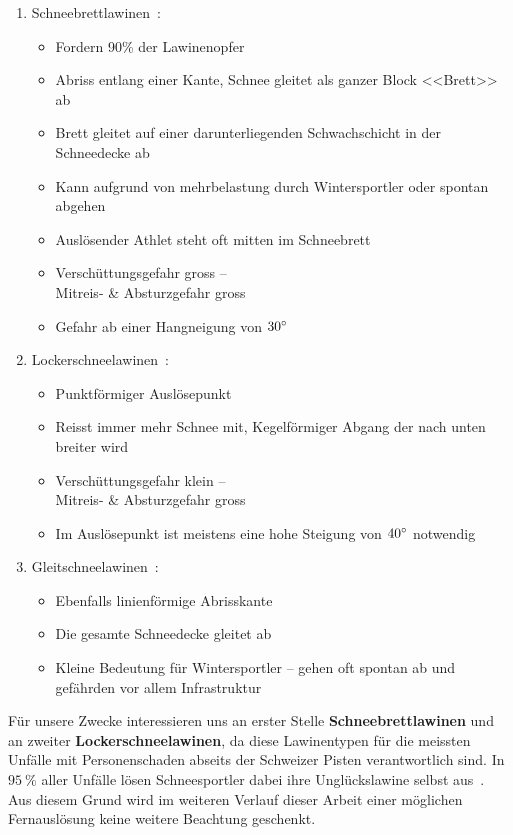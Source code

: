 \begin{multicols}{2}
\begin{enumerate}
  \item Schneebrettlawinen~\cite{sacbergspwinter}\cite{slfLawinentypen}:
  \begin{itemize}
    \item Fordern 90\% der Lawinenopfer
    \item Abriss entlang einer Kante, Schnee gleitet als ganzer Block <<Brett>> ab
    \item Brett gleitet auf einer darunterliegenden Schwachschicht in der Schneedecke ab
    \item Kann aufgrund von mehrbelastung durch Wintersportler oder spontan abgehen
    \item Auslösender Athlet steht oft mitten im Schneebrett
    \item Verschüttungsgefahr gross –\\ Mitreis- \& Absturzgefahr gross
    \item Gefahr ab einer Hangneigung von $30\degree$
  \end{itemize}
    
  \item Lockerschneelawinen~\cite{sacbergspwinter}\cite{slfLawinentypen}:
  \begin{itemize}
    \item Punktförmiger Auslösepunkt
    \item Reisst immer mehr Schnee mit, Kegelförmiger Abgang der nach unten breiter wird
    \item Verschüttungsgefahr klein –\\ Mitreis- \& Absturzgefahr gross
    \item Im Auslösepunkt ist meistens eine hohe Steigung von $40\degree$ notwendig
  \end{itemize}

  \item Gleitschneelawinen~\cite{sacbergspwinter}\cite{slfLawinentypen}:
  \begin{itemize}
    \item Ebenfalls linienförmige Abrisskante
    \item Die gesamte Schneedecke gleitet ab
    \item Kleine Bedeutung für Wintersportler – gehen oft spontan ab und gefährden vor allem Infrastruktur
  \end{itemize}
\end{enumerate}
Für unsere Zwecke interessieren uns an erster Stelle \textbf{Schneebrettlawinen} und an zweiter \textbf{Lockerschneelawinen}, da diese Lawinentypen für die meissten Unfälle mit Personenschaden abseits der Schweizer Pisten verantwortlich sind. In $\qty{95}{\percent}$ aller Unfälle lösen Schneesportler dabei ihre Unglückslawine selbst aus~\cite{ortovoxlabsnow}. Aus diesem Grund wird im weiteren Verlauf dieser Arbeit einer möglichen Fernauslösung keine weitere Beachtung geschenkt.


\end{multicols}
